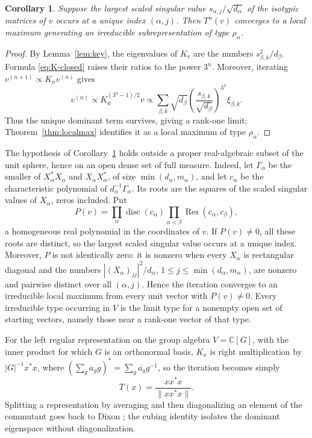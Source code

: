 \documentclass{amsart}
\newtheorem{corollary}[theorem]{Corollary}
\theoremstyle{remark}
\newcommand{\C}{\mathbb C}
\newcommand{\norm}[1]{\lVert #1\rVert}
\begin{document}
\begin{corollary}\label{cor:iteration}
Suppose the largest scaled singular value $s_{\alpha,j}/\sqrt{d_\alpha}$ of the isotypic matrices of
$v$ occurs at a unique index $(\alpha,j)$. Then $T^n(v)$ converges to a local maximum generating an
irreducible subrepresentation of type $\rho_\alpha$.
\end{corollary}
 
\begin{proof}
By Lemma~\ref{lem:key}, the eigenvalues of $K_v$ are the numbers
$s_{\beta,k}^2/d_\beta$. Formula \eqref{eq:K-closed} raises their ratios to the power $3^n$.
Moreover, iterating $v^{(n+1)}\propto K_n v^{(n)}$ gives
\[
 v^{(n)}\propto K_0^{(3^n-1)/2}v
 \propto
 \sum_{\beta,k}\sqrt{d_\beta}
 \left(\frac{s_{\beta,k}}{\sqrt{d_\beta}}\right)^{3^n}\xi_{\beta,k}.
\]
Thus the unique dominant term survives, giving a rank-one limit; Theorem~\ref{thm:localmax} identifies
it as a local maximum of type $\rho_\alpha$.
\end{proof}
 
The hypothesis of Corollary~\ref{cor:iteration} holds outside a proper real-algebraic subset of the
unit sphere, hence on an open dense set of full measure. Indeed, let $\Gamma_\alpha$ be the smaller of
$X_\alpha^*X_\alpha$ and $X_\alpha X_\alpha^*$, of size $\min(d_\alpha,m_\alpha)$, and let $c_\alpha$
be the characteristic polynomial of $d_\alpha^{-1}\Gamma_\alpha$. Its roots are the squares of the
scaled singular values of $X_\alpha$, zeros included. Put
\[
 P(v)=\prod_\alpha\operatorname{disc}(c_\alpha)
 \prod_{\alpha<\beta}\operatorname{Res}(c_\alpha,c_\beta),
\]
a homogeneous real polynomial in the coordinates of $v$. If $P(v)\ne0$, all these roots are distinct,
so the largest scaled singular value occurs at a unique index. Moreover, $P$ is not identically zero:
it is nonzero when every $X_\alpha$ is rectangular diagonal and the numbers
$|(X_\alpha)_{jj}|^2/d_\alpha$, $1\le j\le\min(d_\alpha,m_\alpha)$, are nonzero and pairwise distinct
over all $(\alpha,j)$. Hence the iteration converges to an irreducible local maximum from every unit
vector with $P(v)\ne0$. Every irreducible type occurring in $V$ is the limit type for a nonempty open
set of starting vectors, namely those near a rank-one vector of that type.

For the left regular representation on the group algebra $V=\C[G]$, with the inner product for which
$G$ is an orthonormal basis, $K_x$ is right multiplication by $|G|^{-1}x^*x$, where
$(\sum_ga_gg)^*=\sum_g\overline{a_g}g^{-1}$, so the
iteration becomes simply
\[
 T(x)=\frac{xx^*x}{\norm{xx^*x}}.
\]
Splitting a representation by averaging and then diagonalizing an element of the commutant goes back
to Dixon \cite{Dixon1970}; the cubing identity isolates the dominant eigenspace without
diagonalization.
 
\end{document}
